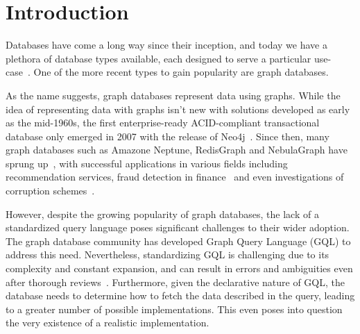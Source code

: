 \documentclass[14pt]{constructor-thesis}
\begin{document}
\maketitle
\tableofcontents
\section*{Introduction}

Databases have come a long way since their inception, and today we have a plethora of database types available, each designed to serve a particular use-case~\cite{database-types}. One of the more recent types to gain popularity are graph databases.

As the name suggests, graph databases represent data using graphs. While the idea of representing data with graphs isn't new with solutions developed as early as the mid-1960s, the first enterprise-ready ACID-compliant transactional database only emerged in 2007 with the release of Neo4j~\cite{enwiki:1146498781}. Since then, many graph databases such as Amazone Neptune, RedisGraph and NebulaGraph have sprung up~\cite{enwiki:1146498781}, with successful applications in various fields including recommendation services, fraud detection in finance~\cite{neo4j:use-cases} and even investigations of corruption schemes~\cite{icij:offshoreleaks}.

However, despite the growing popularity of graph databases, the lack of a standardized query language poses significant challenges to their wider adoption. The graph database community has developed Graph Query Language (GQL) to address this need. Nevertheless, standardizing GQL is challenging due to its complexity and constant expansion, and can result in errors and ambiguities even after thorough reviews~\cite{cpp-std-verified}. Furthermore, given the declarative nature of GQL, the database needs to determine how to fetch the data described in the query, leading to a greater number of possible implementations. This even poses into question the very existence of a realistic implementation.
\end{document}
